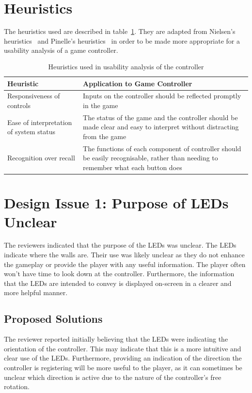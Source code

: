 \documentclass{scrartcl}
\begin{document}
\section{Heuristics}
The heuristics used are described in table~\ref{table:heuristics}. They are adapted from Nielsen's heuristics~\cite{nielsen:heuristics} and Pinelle's heuristics~\cite{pinelle:heuristic} in order to be made more appropriate for a usability analysis of a game controller.

\begin{table}
\centering
\begin{tabular}{| l | p{6cm} |}
\hline
\textbf{Heuristic} & \textbf{Application to Game Controller} \\ \hline
Responsiveness of controls & Inputs on the controller should be reflected promptly in the game \\ \hline
Ease of interpretation of system status & The status of the game and the controller should be made clear and easy to interpret without distracting from the game \\ \hline
Recognition over recall & The functions of each component of controller should be easily recognisable, rather than needing to remember what each button does \\ \hline
\end{tabular}
\caption{Heuristics used in usability analysis of the controller}
\label{table:heuristics}
\end{table}

\section{Design Issue 1: Purpose of LEDs Unclear}
The reviewers indicated that the purpose of the LEDs was unclear. The LEDs indicate where the walls are. Their use was likely unclear as they do not enhance the gameplay or provide the player with any useful information. The player often won't have time to look down at the controller. Furthermore, the information that the LEDs are intended to convey is displayed on-screen in a clearer and more helpful manner.

\subsection{Proposed Solutions}
The reviewer reported initially believing that the LEDs were indicating the orientation of the controller. This may indicate that this is a more intuitive and clear use of the LEDs. Furthermore, providing an indication of the direction the controller is registering will be more useful to the player, as it can sometimes be unclear which direction is active due to the nature of the controller's free rotation. 
\end{document}
